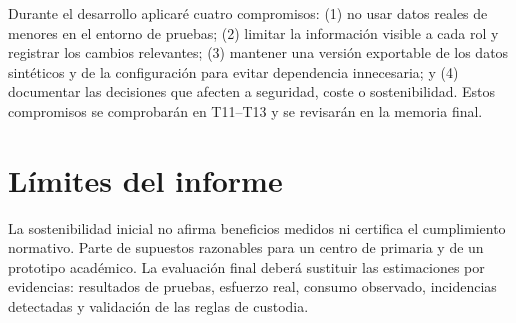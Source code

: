 Durante el desarrollo aplicaré cuatro compromisos: (1) no usar datos reales de menores en el entorno de pruebas; (2) limitar la información visible a cada rol y registrar los cambios relevantes; (3) mantener una versión exportable de los datos sintéticos y de la configuración para evitar dependencia innecesaria; y (4) documentar las decisiones que afecten a seguridad, coste o sostenibilidad. Estos compromisos se comprobarán en T11–T13 y se revisarán en la memoria final.

\section{Límites del informe}\label{sec:5-7}

La sostenibilidad inicial no afirma beneficios medidos ni certifica el cumplimiento normativo. Parte de supuestos razonables para un centro de primaria y de un prototipo académico. La evaluación final deberá sustituir las estimaciones por evidencias: resultados de pruebas, esfuerzo real, consumo observado, incidencias detectadas y validación de las reglas de custodia.

